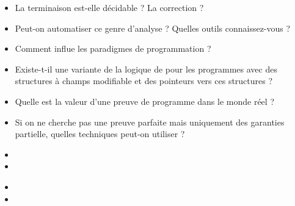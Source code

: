 \documentclass{agregfiche}
\begin{document}
\secquestionsclassiques

\begin{itemize}
	\item La terminaison est-elle décidable ? La correction ?
    \item Peut-on automatiser ce genre d'analyse ? Quelles outils connaissez-vous ?
    \item Comment influe les paradigmes de programmation ?
    \item  Existe-t-il une variante de la logique de  pour les programmes avec des structures à champs modifiable et des pointeurs vers ces structures ?
    \item Quelle est la valeur d'une preuve de programme dans le monde réel ?
    \item Si on ne cherche pas une preuve parfaite mais uniquement des garanties partielle, quelles techniques peut-on utiliser ?
     
\end{itemize}

\secreferences

\begin{itemize}
\item 
\item 
\end{itemize}

\secdev

\begin{itemize}
\item 
\item 
\end{itemize}
\end{document}
